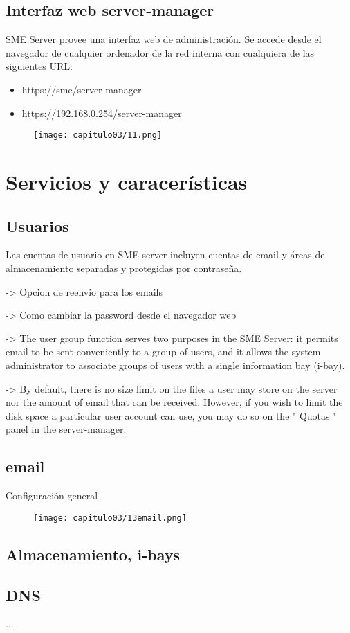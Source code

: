 \subsection{Interfaz web server-manager}

SME Server provee una interfaz web de administración. Se accede desde el navegador de cualquier ordenador de la red interna con cualquiera de las siguientes URL:

\begin{itemize}
  \item https://sme/server-manager
  \item https://192.168.0.254/server-manager
\end{itemize}

\begin{figure}[H]
    \centering
    \texttt{[image: capitulo03/11.png]}
\end{figure}
\newpage 
\section{Servicios y caracerísticas}

\subsection{Usuarios}

Las cuentas de usuario en SME server incluyen cuentas de email y áreas de almacenamiento separadas y protegidas por contraseña.

-> Opcion de reenvio para los emails

-> Como cambiar la password desde el navegador web

-> The user group function serves two purposes in the SME Server: it permits email to be sent conveniently to a group of users, and it allows the system administrator to associate groups of users with a single information bay (i-bay).

-> By default, there is no size limit on the files a user may store on the server nor the amount of email that can be received. However, if you wish to limit the disk space a particular user account can use, you may do so on the " Quotas " panel in the server-manager.

\subsection{email}

Configuración general

\begin{figure}[H]
    \centering
    \texttt{[image: capitulo03/13email.png]}
\end{figure}

\subsection{Almacenamiento, i-bays}

\subsection{DNS}

...


